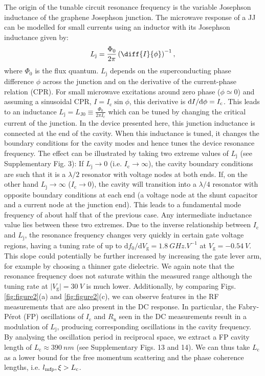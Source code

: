 The origin of the tunable circuit resonance frequency is the variable Josephson inductance of the graphene Josephson junction.
The microwave response of a JJ can be modelled for small currents using an inductor with its Josephson inductance given by:
\begin{equation}
L_\textrm{j} = \frac{\Phi_0}{2\pi} \left(\diff{I}{\phi}\right)^{-1}, \label{eq:Lj}
\end{equation}
where $\Phi_0$ is the flux quantum.
$L_\textrm{j}$ depends on the superconducting phase difference $\phi$ across the junction and on the derivative of the current-phase relation (CPR).
For small microwave excitations around zero phase ($\phi\simeq 0$) and assuming a sinusoidal CPR, $I=I_\textrm{c}\sin\phi$, this derivative is ${\rm d}I/{\rm d}\phi = I_\textrm{c}$.
This leads to an inductance $L_\textrm{j} = L_{\textrm{J}0} \equiv \frac{\Phi_0}{2\pi I_\textrm{c}}$ which can be tuned by changing the critical current of the junction.
In the device presented here, this junction inductance is connected at the end of the cavity.
When this inductance is tuned, it changes the boundary conditions for the cavity modes and hence tunes the device resonance frequency.
The effect can be illustrated by taking two extreme values of $L_\textrm{j}$ (see Supplementary Fig. 3):
If $L_\textrm{j}\rightarrow 0$ (i.e. $I_\textrm{c}\rightarrow\infty$), the cavity boundary conditions are such that it is a $\lambda/2$ resonator with voltage nodes at both ends.
If, on the other hand $L_\textrm{j}\rightarrow \infty$ ($I_\textrm{c}\rightarrow 0$), the cavity will transition into a $\lambda/4$ resonator with opposite boundary conditions at each end (a voltage node at the shunt capacitor and a current node at the junction end).
This leads to a fundamental mode frequency of about half that of the previous case.
Any intermediate inductance value lies between these two extremes.
Due to the inverse relationship between $I_\textrm{c}$ and $L_\textrm{j}$, the resonance frequency changes very quickly in certain gate voltage regions, having a tuning rate of up to $\mathrm{d}f_0/\mathrm{d}V_\textrm{g}=\SI{1.8}{GHz.V^{-1}}$ at $V_\textrm{g}=\SI{-0.54}{V}$.
This slope could potentially be further increased by increasing the gate lever arm, for example by choosing a thinner gate dielectric.
We again note that the resonance frequency does not saturate within the measured range although the tuning rate at $\vert V_\textrm{g} \rvert=\SI{30}{V}$ is much lower.
Additionally, by comparing Figs. \ref{fig:figure2}(a) and \ref{fig:figure2}(c), we can observe features in the RF measurements that are also present in the DC response.
In particular, the Fabry-P\'erot (FP) oscillations of $I_\textrm{c}$ and $R_\textrm{n}$ seen in the DC measurements result in a modulation of $L_\textrm{j}$, producing corresponding oscillations in the cavity frequency.
By analysing the oscillation period in reciprocal space, we extract a FP cavity length of $L_\textrm{c}\approx \SI{390}{nm}$ (see Supplementary Figs. 13 and 14).
We can thus take $L_\textrm{c}$ as a lower bound for the free momentum scattering and the phase coherence lengths, i.e. $l_{\rm mfp},\xi>L_\textrm{c}$.

